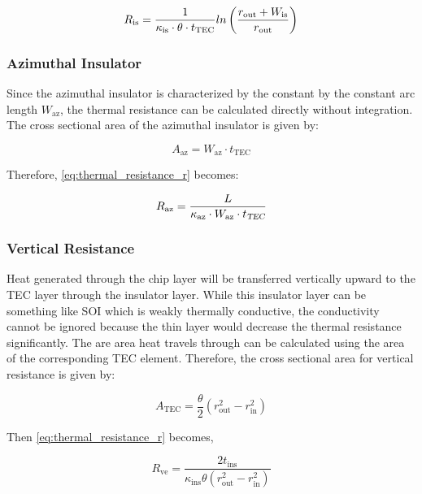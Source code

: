 \documentclass[10pt,a4paper,twocolumn]{article}
\begin{document}
\begin{equation}
  R_{\text{is}} = \frac{1}{\kappa_{\text{is}} \cdot \theta \cdot t_{\text{TEC}}} \\ln\left( \frac{r_{\text{out}} + W_{\text{is}}}{r_{\text{out}}} \right)
  \label{eq:radial_ins_resistance}
\end{equation}

\subsubsection{Azimuthal Insulator}

Since the azimuthal insulator is characterized by the constant by the constant arc length $W_{\text{az}}$, the thermal resistance can be calculated directly without integration. The cross sectional area of the azimuthal insulator is given by:

\begin{equation*}
  A_{\text{az}} = W_{\text{az}} \cdot t_{\text{TEC}}
\end{equation*}

Therefore, \cref{eq:thermal_resistance_r} becomes:

\begin{equation}
  R_{\text{az}} = \frac{L}{\kappa_{\text{az}} \cdot W_{\text{az}} \cdot t_{\textsl{TEC}}}
\end{equation}

\subsubsection{Vertical Resistance}

Heat generated through the chip layer will be transferred vertically upward to the TEC layer through the insulator layer. While this insulator layer can be something like SOI which is weakly thermally conductive, the conductivity cannot be ignored because the thin layer would decrease the thermal resistance significantly. The are area heat travels through can be calculated using the area of the corresponding TEC element. Therefore, the cross sectional area for vertical resistance is given by:

\begin{equation}
  A_{\text{TEC}} = \frac{\theta}{2} (r_{\text{out}}^2 - r_{\text{in}}^2)
  \label{eq:TEC_element_area}
\end{equation}

Then \cref{eq:thermal_resistance_r} becomes,

\begin{equation}
  R_{\text{ve}} = \frac{2 t_{\text{ins}}}{\kappa_{\text{ins}}\theta  \left(r_{\text{out}}^2 - r_{\text{in}}^2\right)}
\end{equation}
\end{document}
